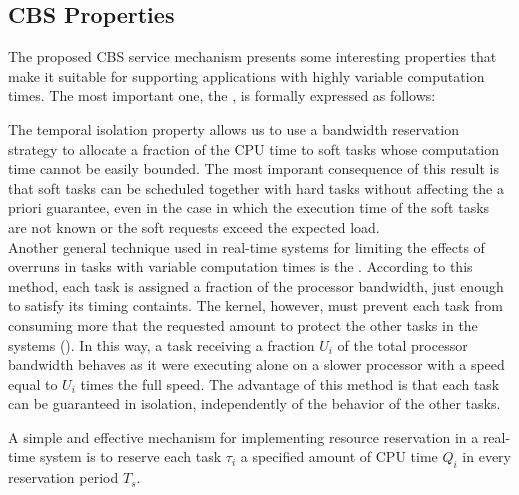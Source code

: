 \subsection{CBS Properties}
The proposed CBS service mechanism presents some interesting properties that make it suitable for supporting applications with highly variable computation times. The most important one, the , is formally expressed as follows:



 The temporal isolation property allows us to use a bandwidth reservation strategy to allocate a fraction of the CPU time to soft tasks whose computation time cannot be easily bounded. The most imporant consequence of this result is that soft tasks can be scheduled together with hard tasks without affecting the a priori guarantee, even in the case in which the execution time of the soft tasks are not known or the soft requests exceed the expected load.\\
 Another general technique used in real-time systems for limiting the effects of overruns in tasks with variable computation times is the . According to this method, each task is assigned a fraction of the processor bandwidth, just enough to satisfy its timing containts. The kernel, however, must prevent each task from consuming more that the requested amount to protect the other tasks in the systems (). In this way, a task receiving a fraction $U_i$ of the total processor bandwidth behaves as it were executing alone on a slower processor with a speed equal to $U_i$ times the full speed. The advantage of this method is that each task can be guaranteed in isolation, independently of the behavior of the other tasks.

 A simple and effective mechanism for implementing resource reservation in a real-time system is to reserve each task $\tau_i$ a specified amount of CPU time $Q_i$ in every reservation period $T_s$.


